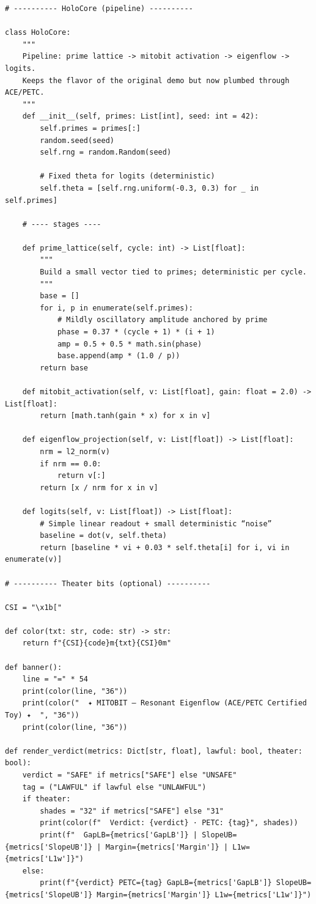 \documentclass[11pt]{article}
\begin{document}
\begin{lstlisting}[style=py,caption={Mitobit (ACE/PETC revision). Self-contained script with weighted-$\ell_1$ projection, ACE surrogates, and PETC prime-lawfulness.},label={lst:code}]
# ---------- HoloCore (pipeline) ----------

class HoloCore:
    """
    Pipeline: prime lattice -> mitobit activation -> eigenflow -> logits.
    Keeps the flavor of the original demo but now plumbed through ACE/PETC.
    """
    def __init__(self, primes: List[int], seed: int = 42):
        self.primes = primes[:]
        random.seed(seed)
        self.rng = random.Random(seed)

        # Fixed theta for logits (deterministic)
        self.theta = [self.rng.uniform(-0.3, 0.3) for _ in self.primes]

    # ---- stages ----

    def prime_lattice(self, cycle: int) -> List[float]:
        """
        Build a small vector tied to primes; deterministic per cycle.
        """
        base = []
        for i, p in enumerate(self.primes):
            # Mildly oscillatory amplitude anchored by prime
            phase = 0.37 * (cycle + 1) * (i + 1)
            amp = 0.5 + 0.5 * math.sin(phase)
            base.append(amp * (1.0 / p))
        return base

    def mitobit_activation(self, v: List[float], gain: float = 2.0) -> List[float]:
        return [math.tanh(gain * x) for x in v]

    def eigenflow_projection(self, v: List[float]) -> List[float]:
        nrm = l2_norm(v)
        if nrm == 0.0:
            return v[:]
        return [x / nrm for x in v]

    def logits(self, v: List[float]) -> List[float]:
        # Simple linear readout + small deterministic “noise”
        baseline = dot(v, self.theta)
        return [baseline * vi + 0.03 * self.theta[i] for i, vi in enumerate(v)]

# ---------- Theater bits (optional) ----------

CSI = "\x1b["

def color(txt: str, code: str) -> str:
    return f"{CSI}{code}m{txt}{CSI}0m"

def banner():
    line = "=" * 54
    print(color(line, "36"))
    print(color("  ✦ MITOBIT — Resonant Eigenflow (ACE/PETC Certified Toy) ✦  ", "36"))
    print(color(line, "36"))

def render_verdict(metrics: Dict[str, float], lawful: bool, theater: bool):
    verdict = "SAFE" if metrics["SAFE"] else "UNSAFE"
    tag = ("LAWFUL" if lawful else "UNLAWFUL")
    if theater:
        shades = "32" if metrics["SAFE"] else "31"
        print(color(f"  Verdict: {verdict} · PETC: {tag}", shades))
        print(f"  GapLB={metrics['GapLB']} | SlopeUB={metrics['SlopeUB']} | Margin={metrics['Margin']} | L1w={metrics['L1w']}")
    else:
        print(f"{verdict} PETC={tag} GapLB={metrics['GapLB']} SlopeUB={metrics['SlopeUB']} Margin={metrics['Margin']} L1w={metrics['L1w']}")


\end{lstlisting}
\end{document}
